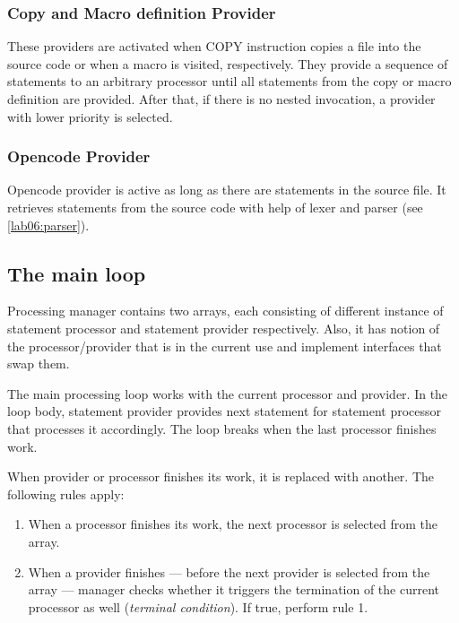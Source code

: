 \subsubsection{Copy and Macro definition Provider}

These providers are activated when COPY instruction copies a file into the source code or when a macro is visited, respectively. They provide a sequence of statements to an arbitrary processor until all statements from the copy or macro definition are provided. After that, if there is no nested invocation, a provider with lower priority is selected.

\subsubsection{Opencode Provider}

Opencode provider is active as long as there are statements in the source file. It retrieves statements from the source code with help of lexer and parser (see \cref{lab06:parser}).

\subsection{The main loop}
\label{lab06:mngr_loop}

Processing manager contains two arrays, each consisting of different instance of statement processor and statement provider respectively.  Also, it has notion of the processor/provider that is in the current use and implement interfaces that swap them.

The main processing loop works with the current processor and provider. In the loop body, statement provider provides next statement for statement processor that processes it accordingly. The loop breaks when the last processor finishes work.

When provider or processor finishes its work, it is replaced with another. The following rules apply:

\begin{enumerate}
	\item When a processor finishes its work, the next processor is selected from the array.
	\item When a provider finishes --- before the next provider is selected from the array --- manager checks whether it triggers the termination of the current processor as well (\emph{terminal condition}). If true, perform rule 1.
\end{enumerate}

